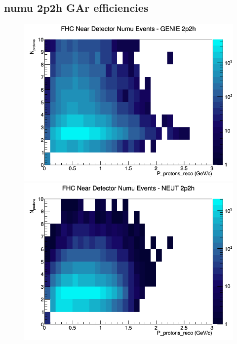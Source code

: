 \subsection{numu 2p2h GAr efficiencies}
\begin{figure}[h]
\includegraphics[width=\linewidth]{eff_N_P/GAr/protons/2p2h_FHC_ND_numu_N_P_GENIE.png}
\endminipage
{}
\includegraphics[width=\linewidth]{eff_N_P/GAr/protons/2p2h_FHC_ND_numu_N_P_NEUT.png}
\endminipage
{}

\end{figure}
